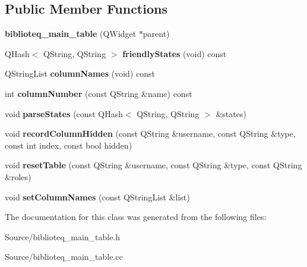 \subsection*{Public Member Functions}
\begin{DoxyCompactItemize}
\item 
{\bfseries biblioteq\+\_\+main\+\_\+table} (Q\+Widget $\ast$parent)\hypertarget{classbiblioteq__main__table_ab3c4f8fa63984fd571de87be8cf4e2ac}{}\label{classbiblioteq__main__table_ab3c4f8fa63984fd571de87be8cf4e2ac}

\item 
Q\+Hash$<$ Q\+String, Q\+String $>$ {\bfseries friendly\+States} (void) const \hypertarget{classbiblioteq__main__table_af5836fee6e018560a9fef97fe557bdb3}{}\label{classbiblioteq__main__table_af5836fee6e018560a9fef97fe557bdb3}

\item 
Q\+String\+List {\bfseries column\+Names} (void) const \hypertarget{classbiblioteq__main__table_aaf9a0b14625e0dd8ceaa1bfe0c54405f}{}\label{classbiblioteq__main__table_aaf9a0b14625e0dd8ceaa1bfe0c54405f}

\item 
int {\bfseries column\+Number} (const Q\+String \&name) const \hypertarget{classbiblioteq__main__table_ada630dc6d45bd2c1ae73889204a38353}{}\label{classbiblioteq__main__table_ada630dc6d45bd2c1ae73889204a38353}

\item 
void {\bfseries parse\+States} (const Q\+Hash$<$ Q\+String, Q\+String $>$ \&states)\hypertarget{classbiblioteq__main__table_a0035686c1a915aefe9ee89de443333c8}{}\label{classbiblioteq__main__table_a0035686c1a915aefe9ee89de443333c8}

\item 
void {\bfseries record\+Column\+Hidden} (const Q\+String \&username, const Q\+String \&type, const int index, const bool hidden)\hypertarget{classbiblioteq__main__table_a0a6a8ea89801929a45f86ca3cf1e3215}{}\label{classbiblioteq__main__table_a0a6a8ea89801929a45f86ca3cf1e3215}

\item 
void {\bfseries reset\+Table} (const Q\+String \&username, const Q\+String \&type, const Q\+String \&roles)\hypertarget{classbiblioteq__main__table_a5c447d10b414d68f4c5d4e052f718b01}{}\label{classbiblioteq__main__table_a5c447d10b414d68f4c5d4e052f718b01}

\item 
void {\bfseries set\+Column\+Names} (const Q\+String\+List \&list)\hypertarget{classbiblioteq__main__table_a8f0aba1cda6e577bd44b7854d813446a}{}\label{classbiblioteq__main__table_a8f0aba1cda6e577bd44b7854d813446a}

\end{DoxyCompactItemize}


The documentation for this class was generated from the following files\+:\begin{DoxyCompactItemize}
\item 
Source/biblioteq\+\_\+main\+\_\+table.\+h\item 
Source/biblioteq\+\_\+main\+\_\+table.\+cc\end{DoxyCompactItemize}
